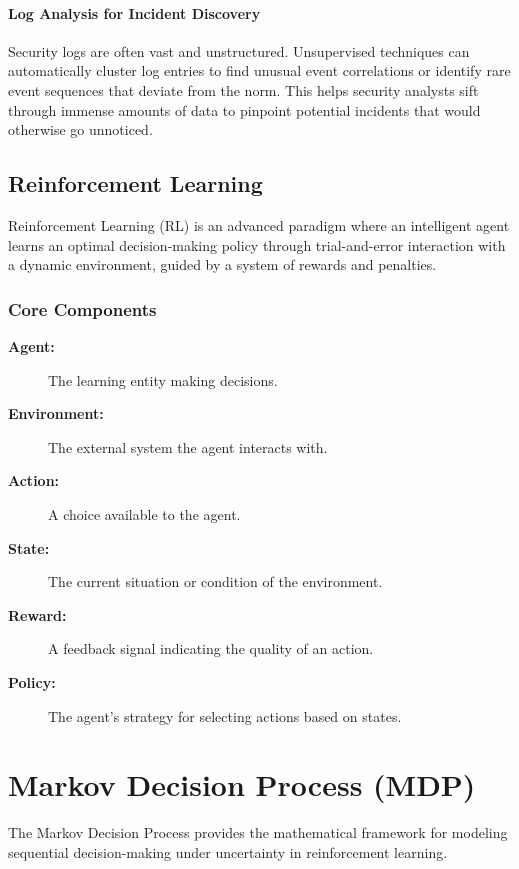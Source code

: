 \documentclass[12pt]{report}
\begin{document}
\paragraph{Log Analysis for Incident Discovery}
Security logs are often vast and unstructured. Unsupervised techniques can automatically cluster log entries to find unusual event correlations or identify rare event sequences that deviate from the norm. This helps security analysts sift through immense amounts of data to pinpoint potential incidents that would otherwise go unnoticed.

\subsection{Reinforcement Learning}
Reinforcement Learning (RL) is an advanced paradigm where an intelligent agent learns an optimal decision-making policy through trial-and-error interaction with a dynamic environment, guided by a system of rewards and penalties.

\subsubsection{Core Components}
\begin{description}
    \item[\textbf{Agent:}] The learning entity making decisions.
    \item[\textbf{Environment:}] The external system the agent interacts with.
    \item[\textbf{Action:}] A choice available to the agent.
    \item[\textbf{State:}] The current situation or condition of the environment.
    \item[\textbf{Reward:}] A feedback signal indicating the quality of an action.
    \item[\textbf{Policy:}] The agent's strategy for selecting actions based on states.
\end{description}

\section{Markov Decision Process (MDP)}
The Markov Decision Process provides the mathematical framework for modeling sequential decision-making under uncertainty in reinforcement learning.
\end{document}
